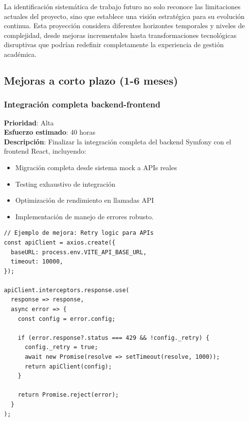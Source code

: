 \documentclass[12pt,a4paper,oneside]{report}
\providecommand{\tightlist}{%
  \setlength{\itemsep}{0pt}\setlength{\parskip}{0pt}}
\begin{document}
La identificación sistemática de trabajo futuro no solo reconoce las
limitaciones actuales del proyecto, sino que establece una visión
estratégica para su evolución continua. Esta proyección considera
diferentes horizontes temporales y niveles de complejidad, desde mejoras
incrementales hasta transformaciones tecnológicas disruptivas que
podrían redefinir completamente la experiencia de gestión académica.

\subsection{Mejoras a corto plazo (1-6
meses)}\label{mejoras-a-corto-plazo-1-6-meses}

\subsubsection{Integración completa
backend-frontend}\label{integraciuxf3n-completa-backend-frontend}

\textbf{Prioridad}: Alta\\
\textbf{Esfuerzo estimado}: 40 horas\\
\textbf{Descripción}: Finalizar la integración completa del backend
Symfony con el frontend React, incluyendo:

\begin{itemize}
\tightlist
\item
  Migración completa desde sistema mock a APIs reales
\item
  Testing exhaustivo de integración
\item
  Optimización de rendimiento en llamadas API
\item
  Implementación de manejo de errores robusto.
\end{itemize}

\begin{lstlisting}
// Ejemplo de mejora: Retry logic para APIs
const apiClient = axios.create({
  baseURL: process.env.VITE_API_BASE_URL,
  timeout: 10000,
});

apiClient.interceptors.response.use(
  response => response,
  async error => {
    const config = error.config;
    
    if (error.response?.status === 429 && !config._retry) {
      config._retry = true;
      await new Promise(resolve => setTimeout(resolve, 1000));
      return apiClient(config);
    }
    
    return Promise.reject(error);
  }
);
\end{lstlisting}
\end{document}
